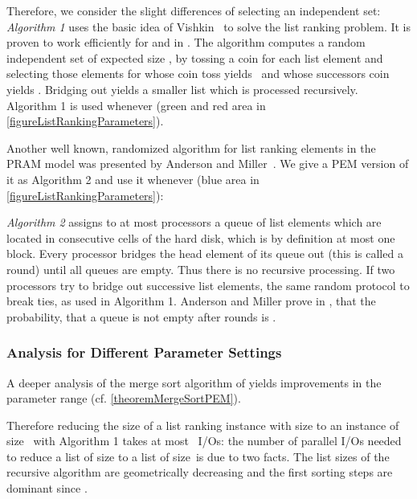 \documentclass[envcountsame]{llncs}
\def\bO#1{\printmath{\mathcal{O}\left(#1\right)}}
\begin{document}
Therefore, we consider the slight differences of selecting an independent set:
\emph{Algorithm 1} uses the basic idea of Vishkin~\cite{1984VishkinRandomizedLR} to solve the list ranking problem.
It is proven to work efficiently for  and  in \cite{2010ArgeEtAlGraphAlgoPEM}. 
The algorithm computes a random independent set  of expected size , by tossing a coin for each list element and selecting those elements for  whose coin toss yields~ and whose successors coin yields .
Bridging out yields a smaller list which is processed recursively.
Algorithm 1 is used whenever  (green and red area in \autoref{figureListRankingParameters}).

Another well known, randomized algorithm for list ranking \smallInstanceSize elements in the PRAM model was presented by Anderson and Miller~\cite{1991AndersonMillerRanomizedWorkOptLR}.
We give a PEM version of it as Algorithm 2 and use it whenever   (blue area in \autoref{figureListRankingParameters}):

\emph{Algorithm 2} assigns to at most  processors a queue of  list elements which are located in consecutive cells of the hard disk, which is by definition at most one block. 
Every processor bridges the head element of its queue out (this is called a round) until all queues are empty.
Thus there is no recursive processing.
If two processors try to bridge out successive list elements, the same random protocol to break ties, as used in Algorithm 1.
Anderson and Miller prove in \cite{1991AndersonMillerRanomizedWorkOptLR}, that the probability, that a queue is not empty after  rounds is . 

\subsubsection{Analysis for Different Parameter Settings}

A deeper analysis of the merge sort algorithm of \cite{2008ArgeEtAlFundamentalPEM} yields improvements in the parameter range (cf. \autoref{theoremMergeSortPEM}).



Therefore reducing the size of a list ranking instance with size  to an instance of size~ with Algorithm 1 takes at most ~I/Os: 
the number of parallel I/Os needed to reduce a list of size  to a list of size~\smallInstanceSize is \bO{\sortp{\inputSize,\memorySize,\blockSize}} due to two facts.
The list sizes of the recursive algorithm are geometrically decreasing and the first sorting steps are dominant since  \cite{1995ChiangExternalMemoryGraphAlgorithms,2010ArgeEtAlGraphAlgoPEM}. 
\end{document}

